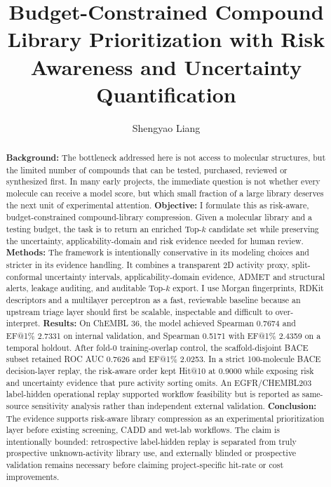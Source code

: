 \documentclass[manuscript=article]{achemso}
\title{Budget-Constrained Compound Library Prioritization with Risk Awareness and Uncertainty Quantification}
\author{Shengyao Liang}
\affiliation{Independent Researcher}
\begin{document}
\begin{abstract}
\textbf{Background:} The bottleneck addressed here is not access to molecular
structures, but the limited number of compounds that can be tested, purchased,
reviewed or synthesized first. In many early projects, the immediate question
is not whether every molecule can receive a model score, but which small
fraction of a large library deserves the next unit of experimental attention.
\textbf{Objective:} I formulate this as risk-aware, budget-constrained
compound-library compression. Given a molecular library and a testing budget,
the task is to return an enriched Top-$k$ candidate set while preserving the
uncertainty, applicability-domain and risk evidence needed for human review.
\textbf{Methods:} The framework is intentionally conservative in its modeling
choices and stricter in its evidence handling. It combines a transparent 2D
activity proxy, split-conformal uncertainty intervals, applicability-domain
evidence, ADMET and structural alerts, leakage auditing, and auditable
Top-$k$ export. I use Morgan fingerprints, RDKit descriptors and a multilayer
perceptron as a fast, reviewable baseline because an upstream triage layer
should first be scalable, inspectable and difficult to over-interpret.
\textbf{Results:} On ChEMBL 36, the model achieved Spearman 0.7674 and
EF@1\% 2.7331 on internal validation, and Spearman 0.5171 with EF@1\% 2.4359
on a temporal holdout. After fold-0 training-overlap control, the
scaffold-disjoint BACE subset retained ROC AUC 0.7626 and EF@1\% 2.0253. In
a strict 100-molecule BACE decision-layer replay, the risk-aware order kept
Hit@10 at 0.9000 while exposing risk and uncertainty evidence that pure
activity sorting omits. An EGFR/CHEMBL203 label-hidden operational replay
supported workflow feasibility but is reported as same-source sensitivity
analysis rather than independent external validation.
\textbf{Conclusion:} The evidence supports risk-aware library compression as
an experimental prioritization layer before existing screening, CADD and
wet-lab workflows. The claim is intentionally bounded: retrospective
label-hidden replay is separated from truly prospective unknown-activity
library use, and externally blinded or prospective validation remains
necessary before claiming project-specific hit-rate or cost improvements.
\end{abstract}
\end{document}
